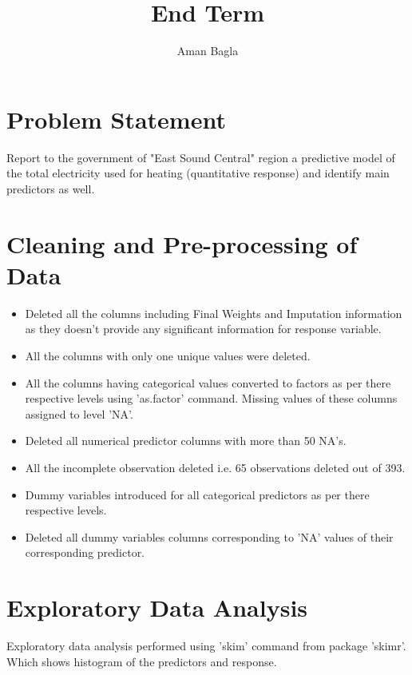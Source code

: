 \documentclass[letterpaper,12pt]{article}
\begin{document}
\title{End Term}
\author{Aman Bagla}
\date{}
\maketitle

\section{Problem Statement}
Report to the government of "East Sound Central" region a predictive model of the total electricity used for heating (quantitative response) and identify main predictors as well.

\section{Cleaning and Pre-processing of Data}
\begin{itemize}
\item Deleted all the columns including Final Weights and Imputation information as they doesn't provide any significant information for response variable.
\item All the columns with only one unique values were deleted.
\item All the columns having categorical values converted to factors as per there respective levels using 'as.factor' command. Missing values of these columns assigned to level 'NA'.
\item Deleted all numerical predictor columns with more than 50 NA's.
\item All the incomplete observation deleted i.e. 65 observations deleted out of 393.
\item Dummy variables introduced for all categorical predictors as per there respective levels.
\item Deleted all dummy variables columns corresponding to 'NA' values of their corresponding predictor.
\end{itemize}

\section{Exploratory Data Analysis}
Exploratory data analysis performed using 'skim' command from package 'skimr'. Which shows histogram of the predictors and response.
\newline
\end{document}
